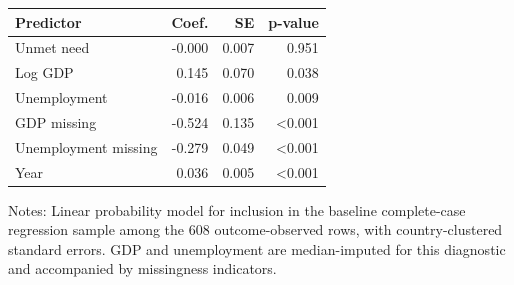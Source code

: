 \begin{tabular}{@{}lrrr@{}}
\toprule
Predictor & Coef. & SE & p-value \\
\midrule
Unmet need & -0.000 & 0.007 & 0.951 \\
Log GDP & 0.145 & 0.070 & 0.038 \\
Unemployment & -0.016 & 0.006 & 0.009 \\
GDP missing & -0.524 & 0.135 & <0.001 \\
Unemployment missing & -0.279 & 0.049 & <0.001 \\
Year & 0.036 & 0.005 & <0.001 \\
\bottomrule
\end{tabular}

\vspace{0.2em}
\begin{minipage}{0.92\textwidth}\scriptsize Notes: Linear probability model for inclusion in the baseline complete-case regression sample among the 608 outcome-observed rows, with country-clustered standard errors. GDP and unemployment are median-imputed for this diagnostic and accompanied by missingness indicators.\end{minipage}
